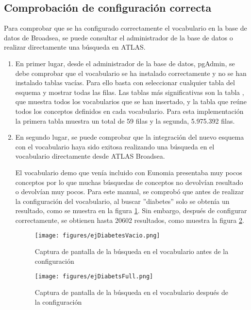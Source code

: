 \subsection{Comprobación de configuración correcta}

Para comprobar que se ha configurado correctamente el vocabulario en la base de datos de Broadsea, se puede consultar el administrador de la base de datos o realizar directamente una búsqueda en ATLAS.

\begin{enumerate}

    \item En primer lugar, desde el administrador de la base de datos, pgAdmin, se debe comprobar que el vocabulario se ha instalado correctamente y no se han instalado tablas vacías. Para ello basta con seleccionar cualquier tabla del esquema  y mostrar todas las filas. Las tablas más significativas son la tabla , que muestra todos los vocabularios que se han insertado, y la tabla  que reúne todos los conceptos definidos en cada vocabulario. Para esta implementación la primera tabla muestra un total de 59 filas y la segunda, 5.975.392 filas.

    \item En segundo lugar, se puede comprobar que la integración del nuevo esquema con el vocabulario haya sido exitosa realizando una búsqueda en el vocabulario directamente desde ATLAS Broadsea. 
    
    El vocabulario demo que venía incluido con Eunomia presentaba muy pocos conceptos por lo que muchas búsquedas de conceptos no devolvían resultado o devolvían muy pocos. Para este manual, se comprobó que antes de realizar la configuración del vocabulario, al buscar ''diabetes'' solo se obtenía un resultado, como se muestra en la figura \ref{fig:ejDiabetesVacio}. Sin embargo, después de configurar correctamente, se obtienen hasta 20602 resultados, como muestra la figura \ref{fig:ejDiabetsFull}.

        \begin{figure}[H]
        \centering
        \texttt{[image: figures/ejDiabetesVacio.png]}
        \caption{Captura de pantalla de la búsqueda en el vocabulario antes de la configuración}
        \label{fig:ejDiabetesVacio}
    \end{figure}

      \begin{figure}[H]
        \centering
        \texttt{[image: figures/ejDiabetsFull.png]}
        \caption{Captura de pantalla de la búsqueda en el vocabulario después de la configuración}
        \label{fig:ejDiabetsFull}
    \end{figure}


\end{enumerate}
